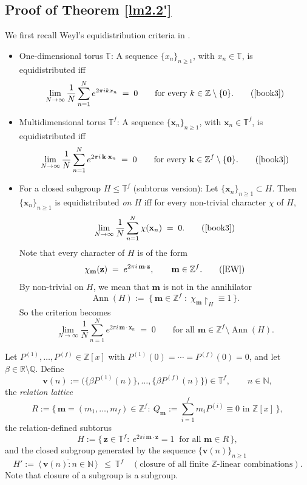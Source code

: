 \documentclass[11pt]{article}
\DeclareMathOperator{\Ann}{Ann}
\def\Z{{\mathbb  Z}}
\def\R{{\mathbb  R}}
\def\N{{\mathbb  N}}
\def\R{\mathbb{R}}
\def \R{{\mathbb R}}
\def \Z{{\mathbb Z}}
\def\Q{\mathbb{Q}}
\theoremstyle{definition}
\newcommand{\T}{\mathbb T}
\begin{document}
\subsection{Proof of Theorem \ref{lm2.2'}}
We first recall  Weyl’s equidistribution criteria in \cite{book3}.

\begin{itemize}
    \item One-dimensional torus $\T$: A sequence $\{x_n\}_{n\ge 1}$, with $x_n\in \T$, is equidistributed iff
\[
 \lim_{N\to\infty} \frac{1}{N}\sum_{n=1}^{N} e^{2\pi i k x_n}\;=\;0
  \qquad\text{for every } k\in \Z\setminus\{0\}. \quad\quad (\cite[\mbox{Theorem 2.1, Chapter 1}]{book3}) 
\]

\item Multidimensional torus $\T^f$: A sequence $\{\mathbf x_n\}_{n\ge 1}$, with $\mathbf{x}_n\in \T^f$, is equidistributed iff
\[
  \lim_{N\to\infty}\frac{1}{N}\sum_{n=1}^{N} e^{2\pi i\, \mathbf k\cdot \mathbf x_n}\;=\;0
  \qquad\text{for every } \mathbf k\in \Z^f\setminus\{\mathbf 0\}.\quad\quad (\cite[\mbox{Theorem 6.2, Chapter 1}]{book3})
\]

\item For a closed subgroup $H\le \T^f$ (subtorus version): Let $\{\mathbf x_n\}_{n\ge 1}\subset H$. Then $\{\mathbf x_n\}_{n\ge 1}$ is equidistributed \emph{on $H$} iff for every
non-trivial character $\chi$ of $H$,
\[
  \lim_{N\to\infty}\frac{1}{N}\sum_{n=1}^{N} \chi(\mathbf x_n)\;=\;0. \quad\quad (\cite[\mbox{Corollary 1.2, Chapter 4}]{book3})
\]
Note that every character of $H$ is of the form
\[
  \chi_{\mathbf m}(\mathbf z) \;=\; e^{2\pi i\, \mathbf m\cdot \mathbf z},
  \qquad \mathbf m\in \Z^f. \quad\quad (\cite[\mbox{Appendix C.3}]{EW})
\]
By non-trivial on $H$, we mean that $\mathbf m$ is not in the annihilator 
$$\Ann(H):=\; \big\{\,\mathbf m\in \Z^f \;:\; \chi_{\mathbf m}\!\restriction_{H}\equiv 1 \,\big\}.$$ So the criterion becomes
\begin{equation}\label{WEC}
  \lim_{N\to \infty}\frac{1}{N}\sum_{n=1}^{N} e^{2\pi i\, \mathbf m\cdot \mathbf x_n}\;=\;0
  \qquad\text{for all } \mathbf m\in \Z^f\setminus \Ann(H).
\end{equation}
\end{itemize}

Let $P^{(1)},\dots,P^{(f)}\in\Z[x]$ with $P^{(1)}(0)=\cdots=P^{(f)}(0)=0$, and let $\beta\in\R\setminus\Q$.
Define
\[
\mathbf v(n):=\big(\{\beta P^{(1)}(n)\},\dots,\{\beta P^{(f)}(n)\}\big)\in\T^f,
\qquad n\in\N,
\]
the \textit{relation lattice}
\[
R:=\Big\{\,\mathbf{m}=(m_1,\dots,m_f)\in\Z^f:\ Q_{\mathbf{m}}:=\sum_{i=1}^f m_i P^{(i)} \equiv 0 \text{ in }\Z[x]\,\Big\},
\]
the relation-defined subtorus
\[
H:=\{\,\mathbf{z}\in\T^f:\ e^{2\pi i\, \mathbf{m}\cdot \mathbf{z}}=1\ \text{ for all }\mathbf{m}\in R\,\},
\]
and the closed subgroup generated by the sequence $\{\mathbf v(n)\}_{n\ge 1}$
\[
H':=\overline{\ \langle\,\mathbf v(n):n\in\N\,\rangle\ } \ \le\ \T^f
\quad(\text{closure of all finite $\Z$-linear combinations}).
\]
Note that closure of a subgroup is a subgroup.
\end{document}
